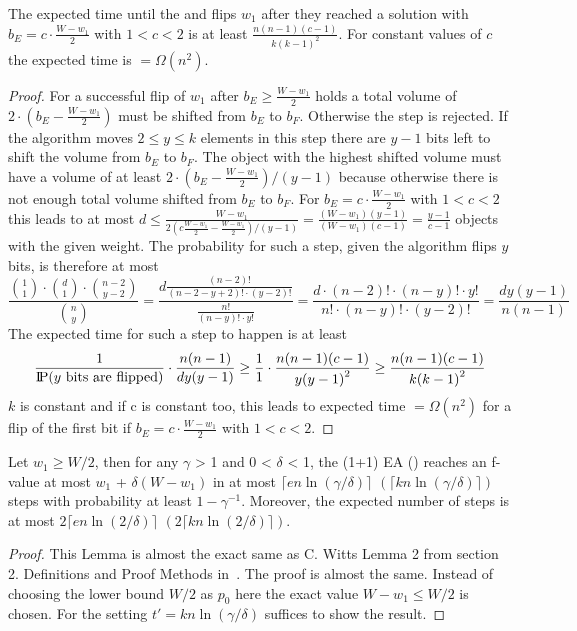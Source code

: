 \begin{lemma}\label{lemma:W1FlipWontHappen}
      The expected time until the \RLSR[k] and \RLSN[k] flips $w_1$ after they reached a solution with $b_E = c\cdot\frac{W-w_1}{2}$ with $1<c<2$ is at least \(\frac{n(n-1)(c-1)}{k{(k-1)}^2}\). For constant values of $c$ the expected time is $=\Omega(n^2)$.
\end{lemma}
\begin{proof}
      For a successful flip of $w_1$ after $b_E \ge \frac{W-w_1}{2}$ holds a total volume of $2\cdot(b_E-\frac{W-w_1}{2})$ must be shifted from $b_E$ to $b_F$.
      Otherwise the step is rejected.
      If the algorithm moves $2\le y\le k$ elements in this step there are $y-1$ bits left to shift the volume from $b_E$ to $b_F$.
      The object with the highest shifted volume must have a volume of at least $2\cdot(b_E-\frac{W-w_1}{2})/(y-1)$ because otherwise there is not enough total volume shifted from $b_E$ to $b_F$.
      For $b_E = c\cdot\frac{W-w_1}{2}$ with $1<c<2$ this leads to at most \(d\le\frac{W-w_1}{2(c\frac{W-w_1}{2}-\frac{W-w_1}{2})/(y-1)}=\frac{(W-w_1)(y-1)}{(W-w_1)(c-1)}=\frac{y-1}{c-1}\) objects with the given weight.
      The probability for such a step, given the algorithm flips $y$ bits, is therefore at most
      \[
            \frac{\binom{1}{1}\cdot\binom{d}{1}\cdot\binom{n-2}{y-2}}{\binom{n}{y}}
            =\frac{d\frac{(n-2)!}{(n-2-y+2)!\cdot (y-2)!}}{\frac{n!}{(n-y)!\cdot y!}}
            =\frac{d\cdot(n-2)!\cdot(n-y)!\cdot y!}{n!\cdot(n-y)!\cdot(y-2)!}
            =\frac{dy(y-1)}{n(n-1)}
            \]
      The expected time for such a step to happen is at least
      \[
            \frac{1}{\text{I\kern-0.15em P}(y\text{ bits are flipped})}\cdot\frac{n(n-1)}{dy(y-1)}
            \ge\frac{1}{1}\cdot\frac{n(n-1)(c-1)}{y{(y-1)}^2}
            \ge\frac{n(n-1)(c-1)}{k{(k-1)}^2}
            \]
      $k$ is constant and if c is constant too, this leads to expected time $=\Omega(n^2)$ for a flip of the first bit if $b_E = c\cdot\frac{W-w_1}{2}$ with $1<c<2$.
\end{proof}

\begin{lemma}\label{lemma:CWittRefined}
      Let $w_1\ge W/2$, then for any $\gamma$ > 1 and 0 < $\delta$ < 1, the (1+1) EA (\RLSR[k]) reaches an f-value at most $w_1$ + $\delta(W-w_1)$ in at most $\lceil en\ln(\gamma/\delta)\rceil$ $(\lceil kn\ln(\gamma/\delta)\rceil)$ steps with probability at least $1-\gamma^{-1}$. Moreover, the expected number of steps is at most $2\lceil en\ln(2/\delta)\rceil$ $(2\lceil kn\ln(2/\delta)\rceil)$.
\end{lemma}
\begin{proof}
      This Lemma is almost the exact same as C. Witts  Lemma 2 from section 2. Definitions and Proof Methods in~\cite{witt2005worst}.
      The proof is almost the same.
      Instead of choosing the lower bound $W/2$ as $p_0$ here the exact value $W-w_1\le W/2$ is chosen.
      For the \RLSR[k] setting $t'=kn\ln(\gamma/\delta)$ suffices to show the result.
\end{proof}

